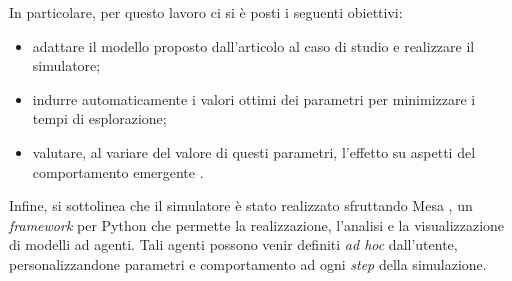 In particolare, per questo lavoro ci si è posti i seguenti obiettivi:\begin{itemize}
	\item adattare il modello proposto dall'articolo al caso di studio e realizzare il simulatore;
	\item indurre automaticamente i valori ottimi dei parametri per minimizzare i tempi di esplorazione;
	\item valutare, al variare del valore di questi parametri, l'effetto su aspetti del comportamento emergente .
\end{itemize}
Infine, si sottolinea che il simulatore è stato realizzato sfruttando Mesa \cite{Mesa}, un \textit{framework} per Python che permette la realizzazione, l'analisi e la visualizzazione di modelli ad agenti.
Tali agenti possono venir definiti \textit{ad hoc} dall'utente, personalizzandone parametri e comportamento ad ogni \textit{step} della simulazione.